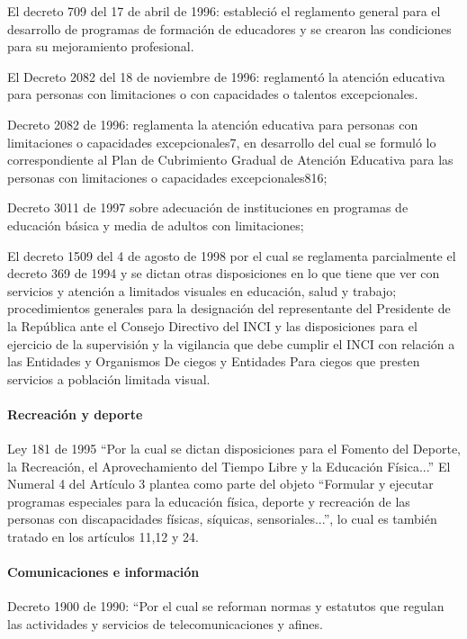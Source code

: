 \documentclass[a4paper, 12pt, oneside]{article}
\begin{document}
	El decreto 709 del 17 de abril de 1996: estableció el reglamento general para el desarrollo de programas de formación de educadores y se crearon las condiciones para su mejoramiento profesional.

	El Decreto 2082 del 18 de noviembre de 1996: reglamentó la atención educativa para personas con limitaciones o con capacidades o talentos excepcionales.

	Decreto 2082 de 1996: reglamenta la atención educativa para personas con limitaciones o capacidades excepcionales7, en desarrollo del cual se formuló lo correspondiente al Plan de Cubrimiento Gradual de Atención Educativa para las personas con limitaciones o capacidades excepcionales816;

	Decreto 3011 de 1997 sobre adecuación de instituciones en programas de educación básica y media de adultos con limitaciones;

	El decreto 1509 del 4 de agosto de 1998 por el cual se reglamenta parcialmente el decreto 369 de 1994 y se dictan otras disposiciones en lo que tiene que ver con servicios y atención a limitados visuales en educación, salud y trabajo; procedimientos generales para la designación del representante del Presidente de la República ante el Consejo Directivo del INCI y las disposiciones para el ejercicio de la supervisión y la vigilancia que debe cumplir el INCI con relación a las Entidades y Organismos De ciegos y Entidades Para ciegos que presten servicios a población limitada visual.

	\paragraph{Recreación y deporte}

	Ley 181 de 1995 “Por la cual se dictan disposiciones para el Fomento del Deporte, la Recreación, el Aprovechamiento del Tiempo Libre y la Educación Física...” El Numeral 4 del Artículo 3 plantea como parte del objeto “Formular y ejecutar programas especiales para la educación física, deporte y recreación de las personas con discapacidades físicas, síquicas, sensoriales...”, lo cual es también tratado en los artículos 11,12 y 24.

	\paragraph{Comunicaciones e información}

	Decreto 1900 de 1990: “Por el cual se reforman normas y estatutos que regulan las actividades y servicios de telecomunicaciones y afines.
\end{document}
